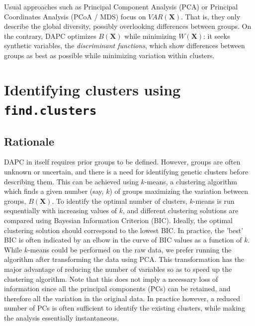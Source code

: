 \documentclass{article}
\newcommand{\m}[1]{\mathbf{#1}}
\newcommand{\code}[1]{{{\tt #1}}}
\begin{document}
Usual approaches such as Principal Component Analysis (PCA) or Principal Coordinates
Analysis (PCoA / MDS) focus on $VAR(\m{X})$. That is, they only describe the global diversity,
possibly overlooking differences between groups. On the contrary, DAPC optimizes $B(\m{X})$ while
minimizing $W(\m{X})$: it seeks synthetic variables, the \textit{discriminant functions}, which show
differences between groups as best as possible while minimizing variation within clusters.










\section{Identifying clusters using \code{find.clusters}}

\subsection{Rationale}
DAPC in itself requires prior groups to be defined. However, groups are often unknown or uncertain,
and there is a need for identifying genetic clusters before describing them. This can be achieved
using $k$-means, a clustering algorithm which finds a given number (say, $k$) of groups maximizing the variation between
groups, $B(\m{X})$. To identify the optimal number of clusters, $k$-means is run sequentially with
increasing values of $k$, and different clustering solutions are compared using Bayesian Information
Criterion (BIC). Ideally, the optimal clustering solution should correspond to the lowest BIC. In
practice, the 'best' BIC is often indicated by an elbow in the curve of BIC values as a function of
$k$.
\\


While $k$-means could be performed on the raw data, we prefer running the algorithm after
transforming the data using PCA. This transformation has the major advantage of reducing the
number of variables so as to speed up the clustering algorithm. Note that this does not imply a necessary
loss of information since all the principal components (PCs) can be retained, and therefore all the variation in the original data.
In practice however, a reduced number of PCs is often sufficient to identify the existing clusters,
while making the analysis essentially instantaneous.
\end{document}

